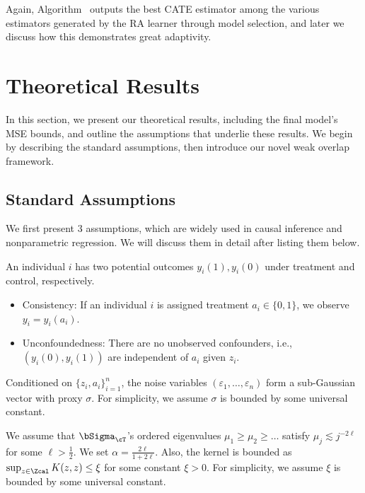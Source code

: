 \documentclass[12pt,a4paper,pdftex,onepage]{article}
\begin{document}
Again, Algorithm~ outputs the best CATE estimator among the various estimators generated by the RA learner through model selection, and later we discuss how this demonstrates great adaptivity.


\section{Theoretical Results}\label{section; main results}

In this section, we present our theoretical results, including the final model's MSE bounds, and outline the assumptions that underlie these results. 
We begin by describing the standard assumptions, then introduce our novel weak overlap framework.

\subsection{Standard Assumptions}

We first present 3 assumptions, which are widely used in causal inference and nonparametric regression.
We will discuss them in detail after listing them below.

\begin{assumption}\label{assumption; consistency and unconfoundedness}
An individual $i$ has two potential outcomes \(y_i(1), y_i(0)\) under treatment and control, respectively.
\begin{itemize}
\item Consistency: If an individual $i$ is assigned treatment $a_i \in \{0, 1\}$, we observe \(y_i = y_i(a_i)\). 
\item Unconfoundedness: There are no unobserved confounders, i.e., $( y_i(0), y_i(1) )$ are independent of $a_i$ given $z_i$.    
\end{itemize}
\end{assumption}

\begin{assumption}\label{assumption; subGaussian noise}
Conditioned on \(\{z_i,a_i\}_{i=1}^{n}\), the noise variables \((\varepsilon_1, \dots, \varepsilon_n)\) form a sub-Gaussian vector with proxy \(\sigma\).
For simplicity, we assume \(\sigma\) is bounded by some universal constant.
\end{assumption}


\begin{assumption}\label{Assumption; eigenvalue decay}\label{assumption; boundedness}
We assume that \(\bSigma_\cT\)'s ordered eigenvalues \(\mu_1 \geq \mu_2 \geq \dots\) satisfy \(\mu_j \lesssim j^{-2\ell}\) for some \(\ell > \frac{1}{2}\).
We set \(\alpha = \frac{2\ell}{1+2\ell}\).
Also, the kernel is bounded as \(\sup_{z \in \Zcal}K(z,z) \leq \xi\) for some constant \(\xi>0\).  
For simplicity, we assume \(\xi\) is bounded by some universal constant.
\end{assumption}
\end{document}
